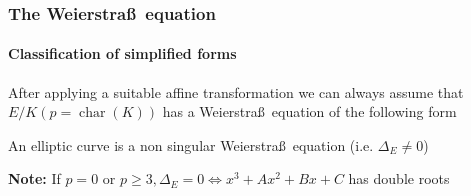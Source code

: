 \documentclass[10pt,final]{beamer} %
\theoremstyle{definition}
\begin{document}
\begin{frame}
\frametitle{The Weierstra\ss\ equation}
\framesubtitle{Classification of simplified forms}

After applying a suitable affine transformation we can always assume that $E/K (p=\operatorname{char}(K))$
has a Weierstra\ss\ equation of the following form\pause

\begin{scriptsize}
\end{scriptsize}\pause

\begin{definition} An elliptic curve is a non
singular Weierstra\ss\ equation (i.e. $\Delta_E\neq0$)
\end{definition}\pause

\small{
\alert{\textbf{Note:} If $p=0$ or $p\ge3, \Delta_E=0\Leftrightarrow x^3+Ax^2+Bx+C$ has double roots}}
\end{frame}
\end{document}
